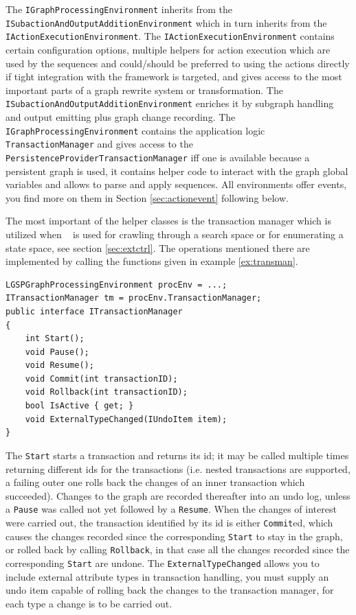 The \texttt{IGraph\-Processing\-Environment} inherits from the \texttt{ISubaction\-And\-Output\-Addition\-Environment} which in turn inherits from the \texttt{IAction\-Execution\-Environment}.
The \texttt{IAction\-Execution\-Environment} contains certain configuration options, multiple helpers for action execution which are used by the sequences and could/should be preferred to using the actions directly if tight integration with the framework is targeted, and gives access to the most important parts of a graph rewrite system or transformation.
The \texttt{ISubaction\-And\-Output\-Addition\-Environment} enriches it by subgraph handling and output emitting plus graph change recording. 
The \texttt{IGraph\-Processing\-Environment} contains the application logic \texttt{Transaction\-Manager} and gives access to the \texttt{Persistence\-Provider\-Transaction\-Manager} iff one is available because a persistent graph is used, it contains helper code to interact with the graph global variables and allows to parse and apply sequences.
All environments offer events, you find more on them in Section \ref{sec:actionevent} following below.

The most important of the helper classes is the transaction manager which is utilized when \GrG~ is used for crawling through a search space or for enumerating a state space, see section \ref{sec:extctrl}.
The operations mentioned there are implemented by calling the functions given in example \ref{ex:transman}.

\begin{example}\label{ex:transman}
\begin{verbatim}
LGSPGraphProcessingEnvironment procEnv = ...;
ITransactionManager tm = procEnv.TransactionManager;
public interface ITransactionManager
{
    int Start();
    void Pause();
    void Resume();
    void Commit(int transactionID);
    void Rollback(int transactionID);
    bool IsActive { get; }
    void ExternalTypeChanged(IUndoItem item);
}
\end{verbatim}
\end{example}

The \texttt{Start} starts a transaction and returns its id; it may be called multiple times returning different ids for the transactions (i.e. nested transactions are supported, a failing outer one rolls back the changes of an inner transaction which succeeded).
Changes to the graph are recorded thereafter into an undo log, unless a \texttt{Pause} was called not yet followed by a \texttt{Resume}.
When the changes of interest were carried out, the transaction identified by its id is either \texttt{Commit}ed, which causes the changes recorded since the corresponding \texttt{Start} to stay in the graph, or rolled back by calling \texttt{Rollback}, in that case all the changes recorded since the corresponding \texttt{Start} are undone.
The \texttt{ExternalTypeChanged} allows you to include external attribute types in transaction handling, you must supply an undo item capable of rolling back the changes to the transaction manager, for each type a change is to be carried out.

